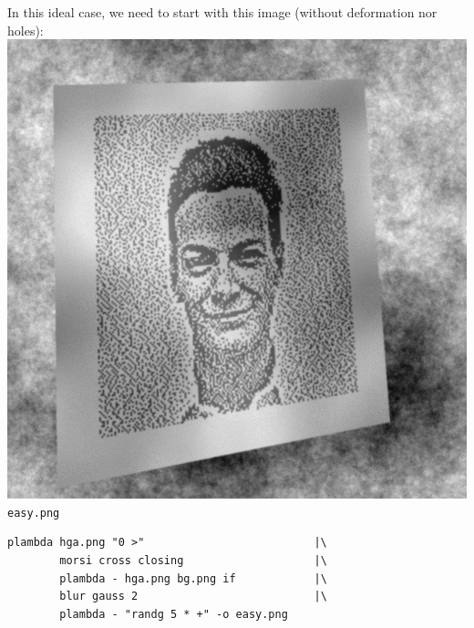 In this ideal case, we need to start with this image (without deformation nor
holes):
\includegraphics{easy.png}\verb+easy.png+
\begin{verbatim}
plambda hga.png "0 >"                          |\
        morsi cross closing                    |\
        plambda - hga.png bg.png if            |\
        blur gauss 2                           |\
        plambda - "randg 5 * +" -o easy.png
\end{verbatim}

